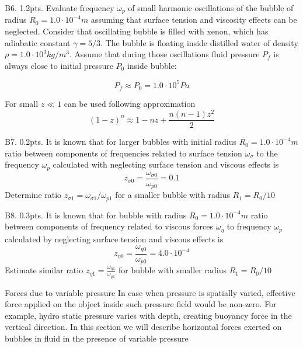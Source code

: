 \begin{subpr}{B6. \hfill 1.2pts.} Evaluate frequency ${\omega_p}$ of small harmonic oscillations of the bubble of radius ${R_0 = 1.0\cdot 10^{-4}}m$ assuming that surface tension and viscosity effects can be neglected. Consider that oscillating bubble is filled with xenon, which has adiabatic constant ${\gamma = 5/3}.$ The bubble is floating inside distilled water of density ${\rho = 1.0\cdot 10^{3}kg/m^3}.$ Assume that during those oscillations  fluid pressure ${P_f}$ is always close to initial pressure ${P_0}$ inside bubble:

$$P_f\approx P_0 = 1.0\cdot 10^{5}Pa$$

For small ${z\ll 1}$ can be used following approximation
$$(1-z)^n\approx 1-nz + \frac{n(n-1)z^2}{2}$$
\end{subpr}
\begin{subpr}{B7. \hfill 0.2pts.}
It is known that for larger bubbles with initial radius ${R_0 = 1.0\cdot 10^{-4}m}$ ratio between components of frequencies related to surface tension ${\omega_{\sigma}}$ to the frequency ${\omega_p}$ calculated with neglecting surface tension and viscous effects is
$$z_{\sigma 0} = \frac{\omega_{\sigma0}}{\omega_{p0}} = 0.1$$
Determine ratio ${z_{\sigma 1} = \omega_{\sigma 1}/\omega_{p1}}$ for a smaller bubble with radius ${R_1 = R_0/10}$
\end{subpr}
\begin{subpr}{B8. \hfill 0.3pts.}
It is known that for bubble with radius ${R_0 = 1.0\cdot 10^{-4}m}$ ratio between components of frequency related to viscous forces ${\omega_{\eta}}$ to frequency ${\omega_{p}}$ calculated by neglecting surface tension and viscous effects is
$$z_{\eta 0} = \frac{\omega_{\eta 0}}{\omega_{p0}} = 4.0\cdot 10^{-4}$$
Estimate similar ratio ${z_{\eta 1} = \frac{\omega_{\eta 1}}{\omega_{p1}}}$ for bubble with smaller radius ${R_1 = R_0/10}$
\end{subpr}
\begin{problem}{Forces due to variable pressure}
In case when pressure is spatially varied, effective force applied on the object inside such pressure field would be non-zero. For example, hydro static pressure varies with depth, creating buoyancy force in the vertical direction. In this section we will describe horizontal forces exerted on bubbles in fluid in the presence of variable pressure
\end{problem}
